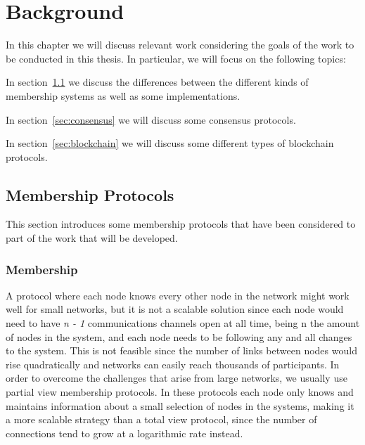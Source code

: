 
%

\chapter{Background}\label{cha:Background}

In this chapter we will discuss relevant work considering the goals of the work
to be conducted in this thesis. In particular, we will focus on the following topics:

In section~\ref{sec:membership_protocols} we discuss the differences between
the different kinds of membership systems as well as some implementations.

In section~\ref{sec:consensus} we will discuss some consensus protocols.

In section~\ref{sec:blockchain} we will discuss some different types of
blockchain protocols.

\section{Membership Protocols}\label{sec:membership_protocols}

This section introduces some membership protocols that have been considered to
part of the work that will be developed.


\subsection{Membership}\label{sub:membership}

A protocol where each node knows every other node in the network might work well
for small networks, but it is not a scalable solution since each node would need
to have \textit{n - 1} communications channels open at all time, being n the
amount of nodes in the system, and each node needs to be following any and all
changes to the system. This is not feasible since the number of links between
nodes would rise quadratically and networks can easily reach thousands of
participants. In order to overcome the challenges that arise from large networks,
we usually use partial view membership protocols. In these protocols each node only knows
and maintains information about a small selection of nodes in the systems,
making it a more scalable strategy than a total view protocol, since
the number of connections tend to grow at a logarithmic rate instead.

